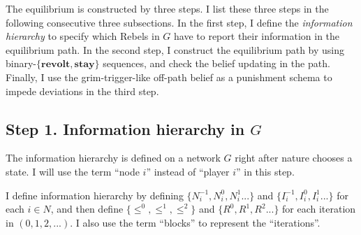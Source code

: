 \documentclass[12pt,letter]{article}
\theoremstyle{definition}
\theoremstyle{remark}
\theoremstyle{claim}
\begin{document}
The equilibrium is constructed by three steps. I list these three steps in the following consecutive three subsections. In the first step, I define the \textit{information hierarchy} to specify which Rebels in $G$ have to report their information in the equilibrium path. In the second step, I construct the equilibrium path by using binary-$\{\textbf{revolt},\textbf{stay}\}$ sequences, and check the belief updating in the path. Finally, I use the grim-trigger-like off-path belief as a punishment schema to impede deviations in the third step.  

\subsection{Step 1. Information hierarchy in $G$}

The information hierarchy is defined on a network $G$ right after nature chooses a state. I will use the term ``node $i$'' instead of ``player $i$'' in this step. 

I define information hierarchy by defining $\{N^{-1}_i,N^{0}_i, N^{1}_i...\}$ and $\{I^{-1}_i,I^{0}_i, I^{1}_i...\}$ for each $i\in N$, and then define $\{\leq^0, \leq^1, \leq^2\}$ and $\{R^0,R^{1}, R^{2}...\}$ for each iteration in $(0,1,2,...)$. I also use the term ``blocks'' to represent the ``iterations''. 
\end{document}
